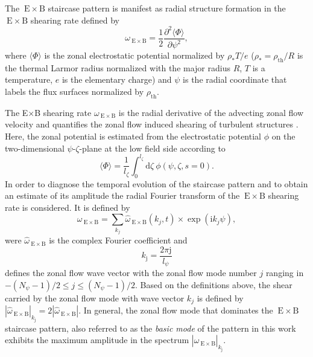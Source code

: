 \documentclass[aip, amsmath, amssymb, reprint, twocolumn]{revtex4-1}
\newcommand{\wexb}{\omega_{\mathrm{\:E \times B}}}
\newcommand{\hatwexb}{\widehat{\omega}_{\mathrm{\:E \times B}}}
\newcommand{\exb}{\mathrm{\:E}\times\mathrm{B}}
\newcommand{\rhoth}{\rho_\mathrm{th}}
\begin{document}
The $\exb$ staircase pattern is manifest as radial structure formation in the $\exb$ shearing rate defined by\cite{rath2016, doi:10.1063/1.3005380, rath2016, peeters2016}
\begin{equation}
	\wexb = \frac{1}{2} \frac{\partial^2 \langle \Phi \rangle}{\partial \psi^2},
	\label{eq:shearingrate}
\end{equation}
where $\langle \Phi \rangle$ is the zonal electrostatic potential normalized by $\rho_\ast T/e$ ($\rho_\ast = \rhoth/R$ is the thermal Larmor radius normalized with the major radius $R$, $T$ is a temperature, $e$ is the elementary charge) and $\psi$ is the radial coordinate that labels the flux surfaces normalized by $\rhoth$. 

The E$\times$B shearing rate $\wexb$ is the radial derivative of the advecting zonal flow velocity \cite{doi:10.1063/1.871313, doi:10.1063/1.872847} and quantifies the zonal flow induced shearing of turbulent structures \cite{doi:10.1063/1.859529, doi:10.1063/1.871313, doi:10.1063/1.872367}. 
Here, the zonal potential is estimated from the electrostatic potential $\phi$ on the two-dimensional $\psi$-$\zeta$-plane at the low field side according to
\begin{equation}
\langle \Phi \rangle = \frac{1}{l_\zeta} \int_0^{l_\zeta} \mathrm{d}\zeta ~ \phi(\psi,\zeta,s=0).
\end{equation}
In order to diagnose the temporal evolution of the staircase pattern and to obtain an estimate of its amplitude the radial Fourier transform of the $\exb$ shearing rate is considered. 
It is defined by
\begin{equation}
	\wexb = \sum_{k_j} \hatwexb(k_j,t) \times \exp(\mathrm{i} k_j \psi),
	\label{eq:shearingrate_fourier}
\end{equation}
were $\hatwexb$ is the complex Fourier coefficient and 
\begin{equation}
	k_\mathrm{j} = \frac{2\pi \mathrm{j}}{l_\psi}
\end{equation}
defines the zonal flow wave vector with the zonal flow mode number $j$ ranging in $-(N_\psi -1)/2 \leq j \leq (N_\psi -1)/2 $.
Based on the definitions above, the shear carried by the zonal flow mode with wave vector $k_j$ is defined by $|\hatwexb|_{k_\mathrm{j}} = 2 |\hatwexb|$. 
In general, the zonal flow mode that dominates the $\exb$ staircase pattern, \textemdash also referred to as the \textit{basic mode } of the pattern in this work \textemdash exhibits the maximum amplitude in the spectrum $|\hatwexb|_{k_\mathrm{j}}$. 
\end{document}
